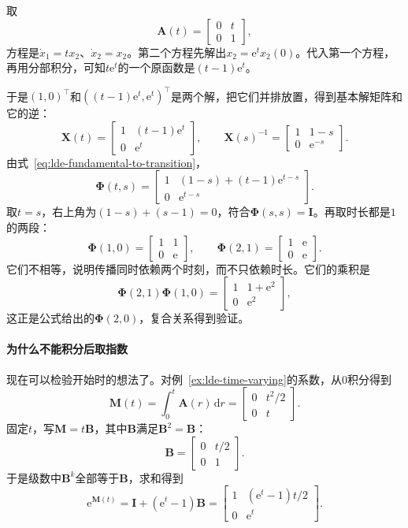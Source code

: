 \begin{example}[一个可解的时变系统]
\label{ex:lde-time-varying}
取
\[
 \bm{A}(t)=\begin{bmatrix}0&t\\0&1\end{bmatrix},
\]
方程是$\dot{x}_1=tx_2$、$\dot{x}_2=x_2$。第二个方程先解出$x_2=\mathrm{e}^{t}x_2(0)$。代入第一个方程，再用分部积分，可知$t\mathrm{e}^{t}$的一个原函数是$(t-1)\mathrm{e}^{t}$。

于是$(1,0)^{\top}$和$((t-1)\mathrm{e}^{t},\mathrm{e}^{t})^{\top}$是两个解，把它们并排放置，得到基本解矩阵和它的逆：
\[
 \bm{X}(t)=\begin{bmatrix}1&(t-1)\mathrm{e}^{t}\\0&\mathrm{e}^{t}\end{bmatrix},\qquad
 \bm{X}(s)^{-1}=\begin{bmatrix}1&1-s\\0&\mathrm{e}^{-s}\end{bmatrix}.
\]
由式~\eqref{eq:lde-fundamental-to-transition}，
\[
 \bm{\Phi}(t,s)=\begin{bmatrix}1&(1-s)+(t-1)\mathrm{e}^{t-s}\\0&\mathrm{e}^{t-s}\end{bmatrix}.
\]
取$t=s$，右上角为$(1-s)+(s-1)=0$，符合$\bm{\Phi}(s,s)=\bm{I}$。再取时长都是$1$的两段：
\[
 \bm{\Phi}(1,0)=\begin{bmatrix}1&1\\0&\mathrm{e}\end{bmatrix},\qquad
 \bm{\Phi}(2,1)=\begin{bmatrix}1&\mathrm{e}\\0&\mathrm{e}\end{bmatrix}.
\]
它们不相等，说明传播同时依赖两个时刻，而不只依赖时长。它们的乘积是
\[
 \bm{\Phi}(2,1)\bm{\Phi}(1,0)=\begin{bmatrix}1&1+\mathrm{e}^2\\0&\mathrm{e}^2\end{bmatrix},
\]
这正是公式给出的$\bm{\Phi}(2,0)$，复合关系得到验证。
\end{example}

\paragraph{为什么不能积分后取指数}
现在可以检验开始时的想法了。对例~\ref{ex:lde-time-varying}的系数，从$0$积分得到
\[
 \bm{M}(t)=\int_0^t\bm{A}(r)\,\mathrm{d}r=\begin{bmatrix}0&t^2/2\\0&t\end{bmatrix}.
\]
固定$t$，写$\bm{M}=t\bm{B}$，其中$\bm{B}$满足$\bm{B}^2=\bm{B}$：
\[
 \bm{B}=\begin{bmatrix}0&t/2\\0&1\end{bmatrix}.
\]
于是级数中$\bm{B}^k$全部等于$\bm{B}$，求和得到
\[
 \mathrm{e}^{\bm{M}(t)}=\bm{I}+(\mathrm{e}^{t}-1)\bm{B}=\begin{bmatrix}1&(\mathrm{e}^{t}-1)t/2\\0&\mathrm{e}^{t}\end{bmatrix}.
\]

